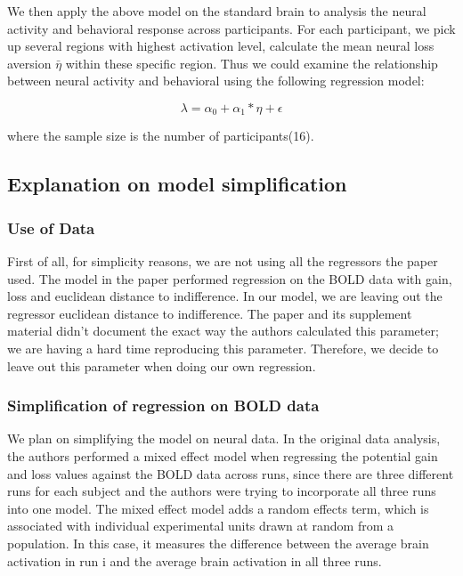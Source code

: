 \documentclass[11pt]{article}
\begin{document}
We then apply the above model on the standard brain to analysis the neural activity and behavioral response across participants. For each participant, we pick up several regions with highest activation level, calculate the mean neural loss aversion $\bar{\eta}$ within these specific region. Thus we could examine the relationship between neural activity and behavioral using the following regression model:

\begin{equation}
\lambda = \alpha_0 + \alpha_1 * \eta + \epsilon
\end{equation}

where the sample size is the number of participants(16).


\subsection{Explanation on model simplification}

\subsubsection{Use of Data}
\indent \indent First of all, for simplicity reasons, we are not using all the regressors the paper used. The model in the paper performed regression on the BOLD data with gain, loss and euclidean distance to indifference. In our model, we are leaving out the regressor euclidean distance to indifference. The paper and its supplement material didn't document the exact way the authors calculated this parameter; we are having a hard time reproducing this parameter. Therefore, we decide to leave out this parameter when doing our own regression.

\subsubsection{Simplification of regression on BOLD data}
\indent \indent We plan on simplifying the model on neural data. In the original data analysis, the authors performed a mixed effect model when regressing the potential gain and loss values against the BOLD data across runs, since there are three different runs for each subject and the authors were trying to incorporate all three runs into one model. The mixed effect model adds a random effects term, which is associated with individual experimental units drawn at random from a population. In this case, it measures the difference between the average brain activation in run i and the average brain activation in all three runs.
\end{document}
